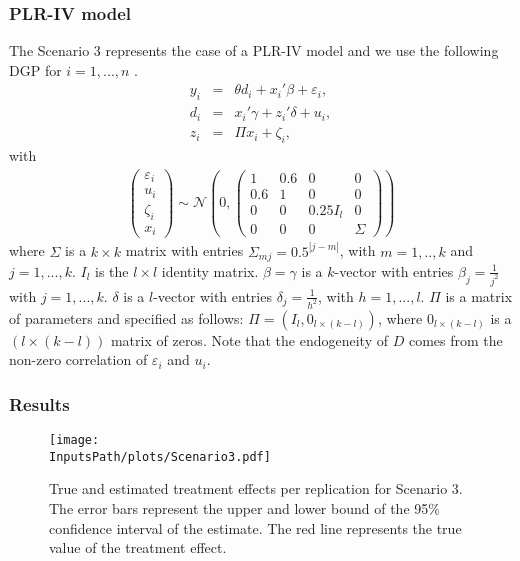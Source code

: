 \documentclass[10pt]{article}
\newcommand*{\InputsFolderPath}{C:/DEV/DML/src/data/}
\newcommand*{\InputsPath}{\InputsFolderPath/20221108}
\begin{document}
\subsubsection{PLR-IV model}
The Scenario 3 represents the case of a PLR-IV model and we use the following DGP for $i=1,...,n$ \cite{Cher2015}.
\begin{eqnarray*}\label{dgp_2.1}
y_i &=& \theta d_i + x_i' \beta + \varepsilon_i,	\\
d_i &=& x_i' \gamma + z_i' \delta + u_i, \\
z_i &=& \Pi x_i + \zeta_i, 
\end{eqnarray*}
with
\begin{eqnarray*}\label{dgp_2.2}
	\left(\begin{matrix} \varepsilon_i \\ u_i \\ \zeta_i \\ x_i \end{matrix} \right) \sim
\mathcal{N}\left(0, \left(\begin{matrix} 1 & 0.6 & 0 & 0 \\ 0.6 & 1 & 0 & 0 \\
	0 & 0 & 0.25 I_{l} & 0 \\ 0 & 0 & 0 & \Sigma \end{matrix} \right) \right)
\end{eqnarray*}
where  $\Sigma$ is a $k \times k$ matrix with entries
$\Sigma_{mj} = 0.5^{|j-m|}$, with $m=1,..,k$ and $j=1,...,k$. 
$I_{l}$ is the $l \times l$ identity matrix.
$\beta = \gamma$ is a $k$-vector with entries $\beta_j=\frac{1}{j^2}$ with  $j=1,...,k$.
$\delta$ is a $l$-vector with entries $\delta_j=\frac{1}{h^2}$, with $h=1,...,l$.
$\Pi$ is a matrix of parameters and specified as follows: $\Pi = (I_{l}, 0_{l \times (k - l)})$, where $ 0_{l \times (k - l)}$ is a $(l \times (k-l))$ matrix of zeros.
Note that the endogeneity of $D$ comes from the non-zero correlation of $\varepsilon_i$ and $u_i$.
\subsubsection{Results}
\begin{figure}[H]
	\begin{center}
		\texttt{[image: \\InputsPath/plots/Scenario3.pdf]}
		\caption{True and estimated treatment effects per replication for Scenario 3. The error bars represent the upper and lower bound of the 95\% confidence interval of the estimate. The red line represents the true value of the treatment effect.}
		\label{Scenario3}
	\end{center}
\end{figure}

\end{document}
